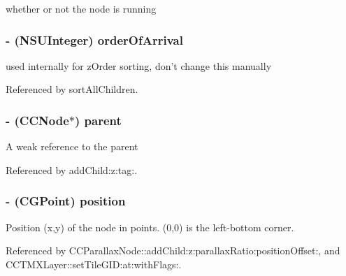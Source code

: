 whether or not the node is running \hypertarget{class_c_c_node_ae56cef8bc876f9f4d609266bc0f80a29}{
\subsubsection[{order\-Of\-Arrival}]{\setlength{\rightskip}{0pt plus 5cm}-\/ (N\-S\-U\-Integer) {\bf order\-Of\-Arrival}}}\label{class_c_c_node_ae56cef8bc876f9f4d609266bc0f80a29}
used internally for z\-Order sorting, don't change this manually 

Referenced by sort\-All\-Children.

\hypertarget{class_c_c_node_a9504c37bbc9d2ca93c34784383b21a26}{
\subsubsection[{parent}]{\setlength{\rightskip}{0pt plus 5cm}-\/ ({\bf C\-C\-Node}$\ast$) {\bf parent}}}\label{class_c_c_node_a9504c37bbc9d2ca93c34784383b21a26}
A weak reference to the parent 

Referenced by add\-Child\-:z\-:tag\-:.

\hypertarget{class_c_c_node_a297b5e96d7c1372d35589a924e1eb286}{
\subsubsection[{position}]{\setlength{\rightskip}{0pt plus 5cm}-\/ (C\-G\-Point) {\bf position}}}\label{class_c_c_node_a297b5e96d7c1372d35589a924e1eb286}
Position (x,y) of the node in points. (0,0) is the left-\/bottom corner. 

Referenced by C\-C\-Parallax\-Node\-::add\-Child\-:z\-:parallax\-Ratio\-:position\-Offset\-:, and C\-C\-T\-M\-X\-Layer\-::set\-Tile\-G\-I\-D\-:at\-:with\-Flags\-:.

